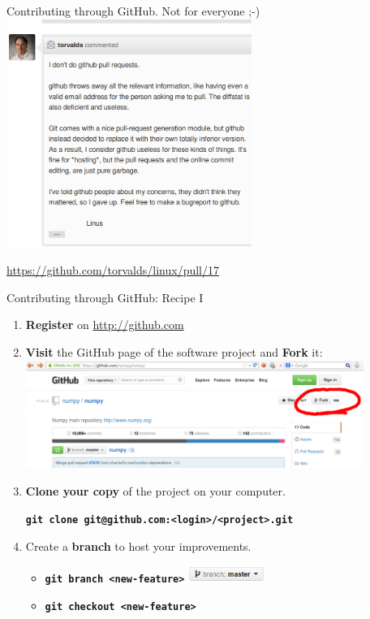 \documentclass{beamer}
\begin{document}
\begin{frame}{Contributing through GitHub. Not for everyone ;-)}
\includegraphics[width=8cm]{UniBo.IDSEPC.A2022.LavoroCondiviso/linus-on-pull-requests}
\begin{center}
  \url{https://github.com/torvalds/linux/pull/17}
\end{center}
\end{frame}

\begin{frame}{Contributing through GitHub: Recipe I}
  \begin{enumerate}
  \item \textbf{Register} on \url{http://github.com}
  \item \textbf{Visit} the GitHub page of the software project and
    \textbf{Fork} it:
    \hbox{\hspace{-1cm}\includegraphics[width=11cm]{UniBo.IDSEPC.A2022.LavoroCondiviso/github-fork}}
  \item \textbf{Clone your copy} of the project on your computer.
    \begin{center}
      \begin{footnotesize}
        \texttt{\textbf{git clone git@github.com:<login>/<project>.git}}
      \end{footnotesize}
    \end{center}
  \item Create a \textbf{branch} to host your improvements.
    \begin{itemize}
    \item \texttt{\textbf{git branch <new-feature>}} \includegraphics[height=0.55cm]{UniBo.IDSEPC.A2022.LavoroCondiviso/github-branch}
    \item \texttt{\textbf{git checkout <new-feature>}}
    \end{itemize}
  \end{enumerate}
\end{frame}
\end{document}
